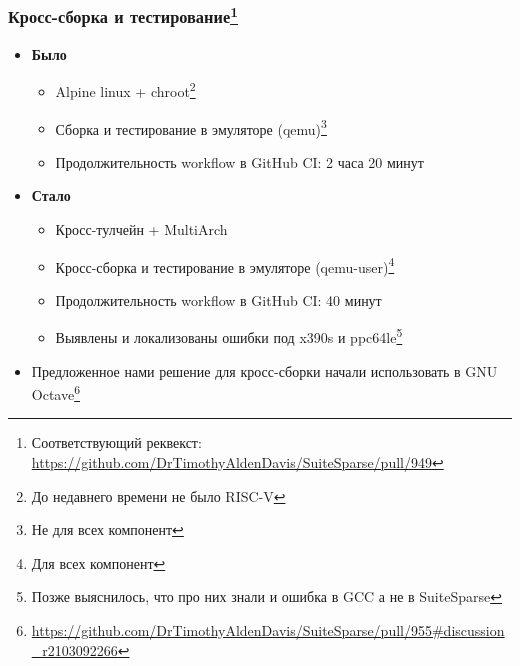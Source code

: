 \documentclass[xcolor=table,aspectratio=169]{beamer}
\begin{document}
\begin{frame}[fragile]
  \frametitle{Кросс-сборка и тестирование\footnote{Соответствующий реквекст: \url{https://github.com/DrTimothyAldenDavis/SuiteSparse/pull/949}}}
  \begin{itemize}
    \item \textbf{Было}
    \begin{itemize}
      \item Alpine linux + chroot\footnote{До недавнего времени не было RISC-V}
      \item Сборка и тестирование в эмуляторе (qemu)\footnote{Не для всех компонент}
      \item Продолжительность workflow в GitHub CI: 2 часа 20 минут
    \end{itemize}
    \pause
    \vfill
    \item \textbf{Стало}
      \begin{itemize}
        \item Кросс-тулчейн + MultiArch
        \item Кросс-сборка и тестирование в эмуляторе (qemu-user)\footnote{Для всех компонент}
        \item Продолжительность workflow в GitHub CI: 40 минут
        \item Выявлены и локализованы ошибки под x390s и ppc64le\footnote{Позже выяснилось, что про них знали и ошибка в GCC а не в SuiteSparse}
      \end{itemize}
    \pause
    \item Предложенное нами решение для кросс-сборки начали использовать в GNU Octave\footnote{\url{https://github.com/DrTimothyAldenDavis/SuiteSparse/pull/955\#discussion_r2103092266}}
  \end{itemize}
\end{frame}
\end{document}

